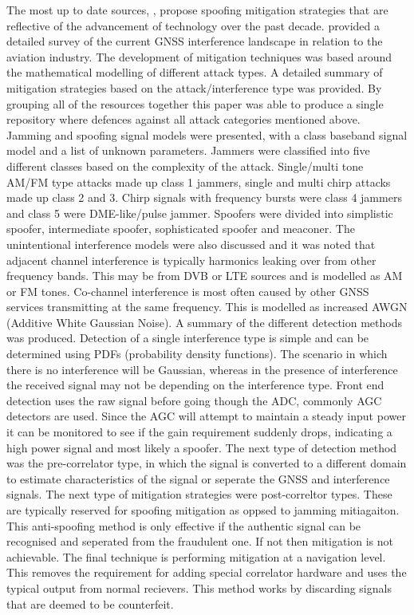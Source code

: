 The most up to date sources, \cite{RN34} \cite{RN36} \cite{RN18}, propose spoofing mitigation strategies that are reflective of the advancement of technology over the
past decade. \textcite{RN34} provided a detailed survey of the current GNSS interference landscape in relation to the aviation industry. The development of mitigation
techniques was based around the mathematical modelling of different attack types. A detailed summary of mitigation strategies
based on the attack/interference type was provided. By grouping all of the resources together this paper was able to produce a single repository where defences against
all attack categories mentioned above. Jamming and spoofing signal models were presented, with a class baseband signal model and a list of unknown parameters. Jammers
were classified into five different classes based on the complexity of the attack. Single/multi tone AM/FM type attacks made up class 1 jammers, single and multi chirp
attacks made up class 2 and 3. Chirp signals with frequency bursts were class 4 jammers and class 5 were DME-like/pulse jammer. Spoofers were divided into simplistic
spoofer, intermediate spoofer, sophisticated spoofer and meaconer. The unintentional interference models were also discussed and it was noted that adjacent channel
interference is typically harmonics leaking over from other frequency bands. This may be from DVB or LTE sources and is modelled as AM or FM tones. Co-channel
interference is most often caused by other GNSS services transmitting at the same frequency. This is modelled as increased AWGN (Additive White Gaussian Noise). A summary
of the different detection methods was produced. Detection of a single interference type is simple and can be determined using PDFs (probability density functions). The
scenario in which there is no interference will be Gaussian, whereas in the presence of interference the received signal may not be depending on the interference type.
Front end detection uses the raw signal before going though the ADC, commonly AGC detectors are used. Since the AGC will attempt to maintain a steady input power it can
be monitored to see if the gain requirement suddenly drops, indicating a high power signal and most likely a spoofer. The next type of detection method was the
pre-correlator type, in which the signal is converted to a different domain to estimate characteristics of the signal or seperate the GNSS and interference signals. The
next type of mitigation strategies were post-correltor types. These are typically reserved for spoofing mitigation as oppsed to jamming mitiagaiton. This anti-spoofing
method is only effective if the authentic signal can be recognised and seperated from the fraudulent one. If not then mitigation is not achievable. The final technique is
performing mitigation at a navigation level. This removes the requirement for adding special correlator hardware and uses the typical output from normal recievers. This
method works by discarding signals that are deemed to be counterfeit.

